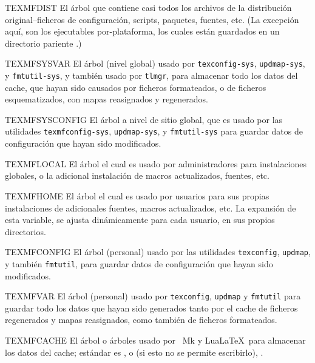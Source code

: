 \documentclass{article}
\begin{document}
\begin{ttdescription}
\item [TEXMFDIST] El árbol que contiene casi todos los
	archivos de la distribución original--ficheros de configuración, scripts, paquetes, fuentes, etc. (La excepción aquí, son los ejecutables por-plataforma, los cuales están guardados en un directorio pariente .)
\item [TEXMFSYSVAR] El árbol (nivel global) usado por \verb+texconfig-sys+, \verb+updmap-sys+, y \verb+fmtutil-sys+, y también usado por \verb+tlmgr+, para almacenar todo los datos del cache, que hayan sido causados por ficheros formateados, o de ficheros esquematizados, con mapas reasignados y regenerados.
\item [TEXMFSYSCONFIG] El árbol a nivel de sitio global, que es usado por las utilidades \verb+texmfconfig-sys+, \verb+updmap-sys+, y \verb+fmtutil-sys+ para guardar datos de configuración que hayan sido modificados.
\item [TEXMFLOCAL] El árbol el cual es usado por administradores para instalaciones globales, o la adicional instalación de macros actualizados, fuentes, etc.
\item [TEXMFHOME] El árbol el cual es usado por usuarios para sus propias instalaciones de adicionales fuentes, macros actualizados, etc. La expansión de esta variable, se ajusta dinámicamente para cada usuario, en sus propios directorios.
\item [TEXMFCONFIG] El árbol (personal) usado por las utilidades \verb+texconfig+, \verb+updmap+, y también \verb+fmtutil+, para guardar datos de configuración que hayan sido modificados.  
\item [TEXMFVAR] El árbol (personal) usado por \verb+texconfig+, \verb+updmap+ y \verb+fmtutil+ para guardar todo los datos que hayan sido generados tanto por el cache de ficheros regenerados y mapas reasignados, como también de ficheros formateados.
\item [TEXMFCACHE] El árbol o árboles usado por \ConTeXt\ Mk y Lua\LaTeX\ para almacenar los datos del cache; estándar es , o (si esto no se permite escribirlo), .
\end{ttdescription}
\end{document}
